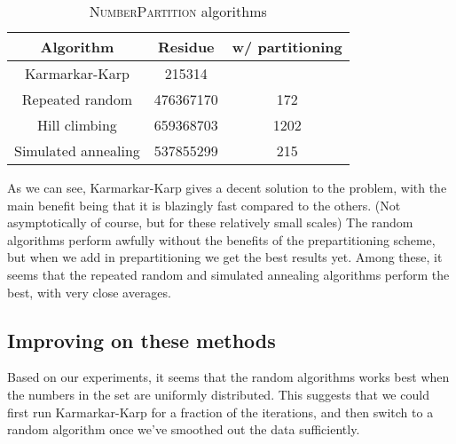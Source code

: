 \documentclass[a4paper, 10pt, twocolumn, twoside]{article}
\begin{document}
\renewcommand{\arraystretch}{2}
\begin{table}[htbp]
\caption{\textsc{NumberPartition} algorithms}
\begin{tabular}{||c|c|c||}
\hline
Algorithm & Residue & w/ partitioning\\
\hline
Karmarkar-Karp & 215314 & \\
Repeated random& 476367170 & 172\\
Hill climbing& 659368703 & 1202\\
Simulated annealing & 537855299 & 215\\
\hline
\end{tabular}
\end{table}

As we can see, Karmarkar-Karp gives a decent solution to the problem, with the main benefit being that it is blazingly fast compared to the others. (Not asymptotically of course, but for these relatively small scales) The random algorithms perform awfully without the benefits of the prepartitioning scheme, but when we add in prepartitioning we get the best results yet. Among these, it seems that the repeated random and simulated annealing algorithms perform the best, with very close averages. 

\subsection{Improving on these methods}

Based on our experiments, it seems that the random algorithms works best when the numbers in the set are uniformly distributed. This suggests that we could first run Karmarkar-Karp for a fraction of the iterations, and then switch to a random algorithm once we've smoothed out the data sufficiently.
\end{document}

